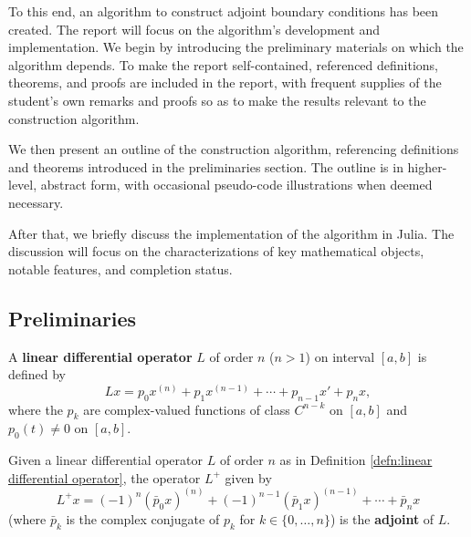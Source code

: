 \documentclass[11pt, oneside, a4paper]{article}
\begin{document}
To this end, an algorithm to construct adjoint boundary conditions has been created. The report will focus on the algorithm's development and implementation. We begin by introducing the preliminary materials on which the algorithm depends. To make the report self-contained, referenced definitions, theorems, and proofs are included in the report, with frequent supplies of the student's own remarks and proofs so as to make the results relevant to the construction algorithm. 

We then present an outline of the construction algorithm, referencing definitions and theorems introduced in the preliminaries section. The outline is in higher-level, abstract form, with occasional pseudo-code illustrations when deemed necessary. 

After that, we briefly discuss the implementation of the algorithm in Julia. The discussion will focus on the characterizations of key mathematical objects, notable features, and completion status.

\subsection{Preliminaries}
\begin{defn}\cite[p.81]{CoddingtonLevinson}\label{defn:linear differential operator}
    A \textbf{linear differential operator} $L$ of order $n$ ($n>1$) on interval $[a,b]$ is defined by
    \[Lx = p_0x^{(n)} + p_1x^{(n-1)} + \cdots + p_{n-1}x' + p_nx,\]
    where the $p_k$ are complex-valued functions of class $C^{n-k}$ on $[a,b]$ and $p_0(t)\neq 0$ on $[a,b]$.
\end{defn}

\begin{defn}\cite[p.84]{CoddingtonLevinson}\label{defn:adjoint linear differential operator}
    Given a linear differential operator $L$ of order $n$ as in Definition \ref{defn:linear differential operator}, the operator $L^+$ given by
    \[L^+x = (-1)^n (\bar{p}_0 x)^{(n)} + (-1)^{n-1}(\bar{p}_1 x)^{(n-1)} +\cdots +\bar{p}_nx\]
    (where $\bar{p}_k$ is the complex conjugate of $p_k$ for $k\in\{0,\ldots,n\}$) is the \textbf{adjoint} of $L$.
\end{defn}
\end{document}
